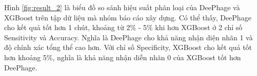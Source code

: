 Hình \ref{fig:result_2} là biểu đồ so sánh hiệu suất phân loại của DeePhage và XGBoost trên tập dữ liệu mà nhóm báo cáo xây dựng. Có thể thấy, DeePhage cho kết quả tốt hơn 1 chút, khoảng từ 2\% - 5\% khi hơn XGBoost ở 2 chỉ số Sensitivity và Accuracy. Nghĩa là DeePhage cho khả năng nhận diện nhãn 1 và độ chính xác tổng thể cao hơn. Với chỉ số Specificity, XGBoost cho kết quả tốt hơn khoảng 5\%, nghĩa là khả năng nhận diễn nhãn 0 của XGBoost tốt hơn DeePhage.

